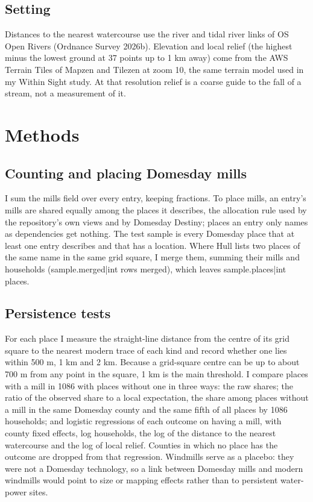 \documentclass[11pt,a4paper]{article}
\begin{document}
\subsection{Setting}

Distances to the nearest watercourse use the river and tidal river links of OS Open Rivers (Ordnance Survey 2026b). Elevation and local relief (the highest minus the lowest ground at 37 points up to 1 km away) come from the AWS Terrain Tiles of Mapzen and Tilezen at zoom 10, the same terrain model used in my Within Sight study. At that resolution relief is a coarse guide to the fall of a stream, not a measurement of it.

\section{Methods}

\subsection{Counting and placing Domesday mills}

I sum the mills field over every entry, keeping fractions. To place mills, an entry's mills are shared equally among the places it describes, the allocation rule used by the repository's own views and by Domesday Destiny; places an entry only names as dependencies get nothing. The test sample is every Domesday place that at least one entry describes and that has a location. Where Hull lists two places of the same name in the same grid square, I merge them, summing their mills and households ({{sample.merged|int}} rows merged), which leaves {{sample.places|int}} places.

\subsection{Persistence tests}

For each place I measure the straight-line distance from the centre of its grid square to the nearest modern trace of each kind and record whether one lies within 500 m, 1 km and 2 km. Because a grid-square centre can be up to about 700 m from any point in the square, 1 km is the main threshold. I compare places with a mill in 1086 with places without one in three ways: the raw shares; the ratio of the observed share to a local expectation, the share among places without a mill in the same Domesday county and the same fifth of all places by 1086 households; and logistic regressions of each outcome on having a mill, with county fixed effects, log households, the log of the distance to the nearest watercourse and the log of local relief. Counties in which no place has the outcome are dropped from that regression. Windmills serve as a placebo: they were not a Domesday technology, so a link between Domesday mills and modern windmills would point to size or mapping effects rather than to persistent water-power sites.
\end{document}
